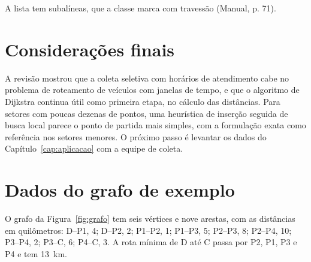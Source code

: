 \documentclass[tid]{texufpel}
\begin{document}
A lista tem subalíneas, que a classe marca com travessão (Manual, p. 71).

\chapter{Considerações finais}
\label{cap:consideracoes}

A revisão mostrou que a coleta seletiva com horários de atendimento cabe no
problema de roteamento de veículos com janelas de tempo, e que o algoritmo de
Dijkstra continua útil como primeira etapa, no cálculo das distâncias. Para
setores com poucas dezenas de pontos, uma heurística de inserção seguida de
busca local parece o ponto de partida mais simples, com a formulação exata
como referência nos setores menores. O próximo passo é levantar os dados do
Capítulo~\ref{cap:aplicacao} com a equipe de coleta.




\apendices

\chapter{Dados do grafo de exemplo}
\label{apx:dados}

O grafo da Figura~\ref{fig:grafo} tem seis vértices e nove arestas, com as
distâncias em quilômetros: D--P1, 4; D--P2, 2; P1--P2, 1; P1--P3, 5; P2--P3,
8; P2--P4, 10; P3--P4, 2; P3--C, 6; P4--C, 3. A rota mínima de D até C passa
por P2, P1, P3 e P4 e tem 13~km.
\end{document}
